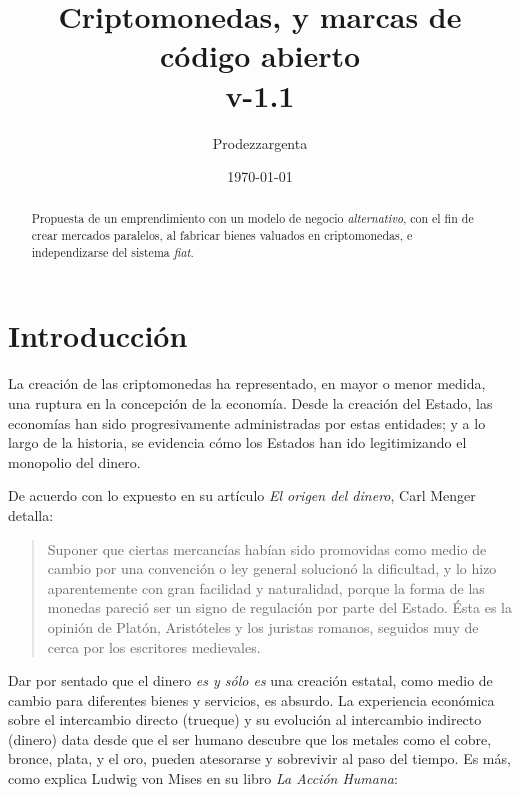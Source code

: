 \documentclass[12pt,a4paper]{article}
\author{Prodezzargenta}
\title{Criptomonedas, y marcas de código abierto \\
		v-1.1}
\date{\today}
\begin{document}
\maketitle

\begin{abstract}
Propuesta de un emprendimiento con un modelo de negocio \textit{alternativo}, con el fin de crear mercados paralelos, al fabricar bienes valuados en criptomonedas, e independizarse del sistema \textit{fiat}.
\end{abstract}
	
\tableofcontents

\section{Introducción}
La creación de las criptomonedas ha representado, en mayor o menor medida, una ruptura en la concepción de la economía. Desde la creación del Estado, las economías han sido progresivamente administradas por estas entidades; y a lo largo de la historia, se evidencia cómo los Estados han ido legitimizando el monopolio del dinero.

De acuerdo con lo expuesto en su artículo \textit{El origen del dinero}, Carl Menger detalla:

\begin{quotation}
Suponer que ciertas mercancías habían sido promovidas como medio de cambio por una convención o ley general solucionó la dificultad, y lo hizo aparentemente con gran facilidad y naturalidad, porque la forma de las monedas pareció ser un signo de regulación por parte del Estado. Ésta es la opinión de Platón, Aristóteles y los juristas romanos, seguidos muy de cerca por los escritores medievales. \cite[págs. 240-241]{menger:origen}
\end{quotation}

Dar por sentado que el dinero \textit{es y sólo es} una creación estatal, como medio de cambio para diferentes bienes y servicios, es absurdo. La experiencia económica sobre el intercambio directo (trueque) y su evolución al intercambio indirecto (dinero) data desde que el ser humano descubre que los metales como el cobre, bronce, plata, y el oro, pueden atesorarse y sobrevivir al paso del tiempo. Es más, como explica Ludwig von Mises en su libro \textit{La Acción Humana}:
\end{document}
